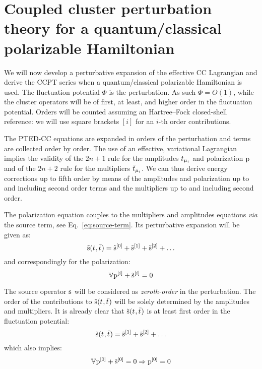 \section{Coupled cluster perturbation theory for a quantum/classical
  polarizable Hamiltonian}\label{sec:ccpt-polarizable}

We will now develop a perturbative expansion of the effective \acs{CC}
Lagrangian and derive the \acs{CC}\acs{PT} series when a
quantum/classical polarizable Hamiltonian is used.
The fluctuation potential $\Phi$ is the perturbation. As such $\Phi =
O(1)$, while the cluster operators will be of first, at least, and higher
order in the fluctuation potential.
Orders will be counted assuming an Hartree--Fock closed-shell reference:
we will use square brackets $[i]$ for an $i$-th order contributions.

The \acs{PTED}-\acs{CC} equations are expanded in orders of the
perturbation and terms are collected order by order. The use of an
effective, variational Lagrangian implies the validity of the $2n+1$
rule for the amplitudes $t_{\mu_i}$ and polarization $\mathrm{p}$ and of the
$2n+2$ rule for the multipliers $\bar{t}_{\mu_i}$.
We can thus derive energy corrections up to fifth order by means of the
amplitudes and polarization up to and including second order terms and
the multipliers up to and including second order.

The polarization equation couples to the multipliers and amplitudes
equations \emph{via} the source term, see Eq.~\eqref{eq:source-term}.
Its perturbative expansion will be given as:
\begin{equation}\label{eq:source-term-pt}
  \tilde{\mathrm{s}}(t_{},\bar{t}_{}) =
  \tilde{\mathrm{s}}^{[0]}
  + \tilde{\mathrm{s}}^{[1]}
  + \tilde{\mathrm{s}}^{[2]}
  + \ldots
\end{equation}
and correspondingly for the polarization:
\begin{equation}\label{eq:pol-eq-pt}
  \mathbb{V}\mathrm{p}^{[i]} + \tilde{\mathrm{s}}^{[i]} = 0
\end{equation}

The source operator $\mathrm{s}$ will
be considered as \emph{zeroth-order} in the perturbation. The order of
the contributions to $\tilde{\mathrm{s}}(t_{},\bar{t}_{})$ will be solely
determined by the amplitudes and multipliers.
It is already clear that $\tilde{\mathrm{s}}(t_{},\bar{t}_{})$ is at least first
order in the fluctuation potential:
\begin{equation}
  \tilde{\mathrm{s}}(t_{},\bar{t}_{}) =
  \tilde{\mathrm{s}}^{[1]}
  + \tilde{\mathrm{s}}^{[2]}
  + \ldots
\end{equation}
which also implies:
\begin{equation}
  \mathbb{V}\mathrm{p}^{[0]} + \tilde{\mathrm{s}}^{[0]} = 0 \Rightarrow  \mathrm{p}^{[0]} = 0
\end{equation}


